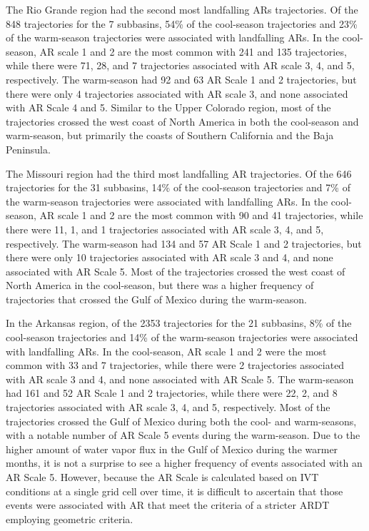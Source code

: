 \documentclass[draft]{agujournal2019}
\begin{document}
The Rio Grande region had the second most landfalling ARs trajectories. Of the 848 trajectories for the 7 subbasins, 54\% of the cool-season trajectories and 23\% of the warm-season trajectories were associated with landfalling ARs. In the cool-season, AR scale 1 and 2 are the most common with 241 and 135 trajectories, while there were 71, 28, and 7 trajectories associated with AR scale 3, 4, and 5, respectively. The warm-season had 92 and 63 AR Scale 1 and 2 trajectories, but there were only 4 trajectories associated with AR scale 3, and none associated with AR Scale 4 and 5. Similar to the Upper Colorado region, most of the trajectories crossed the west coast of North America in both the cool-season and warm-season, but primarily the coasts of Southern California and the Baja Peninsula. 

The Missouri region had the third most landfalling AR trajectories. Of the 646 trajectories for the 31 subbasins, 14\% of the cool-season trajectories and 7\% of the warm-season trajectories were associated with landfalling ARs. In the cool-season, AR scale 1 and 2 are the most common with 90 and 41 trajectories, while there were 11, 1, and 1 trajectories associated with AR scale 3, 4, and 5, respectively. The warm-season had 134 and 57 AR Scale 1 and 2 trajectories, but there were only 10 trajectories associated with AR scale 3 and 4, and none associated with AR Scale 5. Most of the trajectories crossed the west coast of North America in the cool-season, but there was a higher frequency of trajectories that crossed the Gulf of Mexico during the warm-season.

In the Arkansas region, of the 2353 trajectories for the 21 subbasins, 8\% of the cool-season trajectories and 14\% of the warm-season trajectories were associated with landfalling ARs. In the cool-season, AR scale 1 and 2 were the most common with 33 and 7 trajectories, while there were 2 trajectories associated with AR scale 3 and 4, and none associated with AR Scale 5. The warm-season had 161 and 52 AR Scale 1 and 2 trajectories, while there were 22, 2, and 8 trajectories associated with AR scale 3, 4, and 5, respectively. Most of the trajectories crossed the Gulf of Mexico during both the cool- and warm-seasons, with a notable number of AR Scale 5 events during the warm-season. Due to the higher amount of water vapor flux in the Gulf of Mexico during the warmer months, it is not a surprise to see a higher frequency of events associated with an AR Scale 5. However, because the AR Scale is calculated based on IVT conditions at a single grid cell over time, it is difficult to ascertain that those events were associated with AR that meet the criteria of a stricter ARDT employing geometric criteria.
\end{document}
